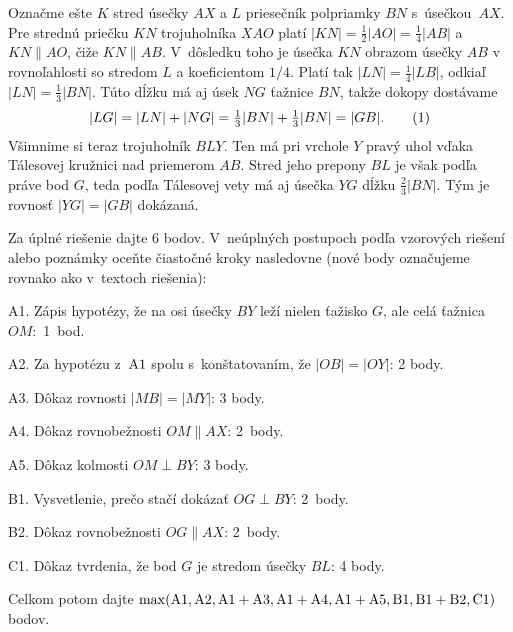 {Označme ešte $K$ stred úsečky $AX$ a $L$ priesečník polpriamky $BN$
s~úsečkou~$AX$. Pre strednú priečku $KN$ trojuholníka $XAO$ platí
$|KN|=\frac12|AO|=\frac14|AB|$ a $KN\parallel AO$, čiže $KN\parallel
AB$. V~dôsledku toho je úsečka $KN$ obrazom úsečky $AB$
v rovnoľahlosti so stredom $L$ a koeficientom $1/4$.
Platí tak $|LN|=\frac14|LB|$,
odkiaľ $|LN|=\frac13|BN|$. Túto dĺžku má aj úsek $NG$ ťažnice $BN$,
takže dokopy dostávame
$$
|LG|=|LN|+|NG|=\tfrac13|BN|+\tfrac13|BN|=|GB|.
\tag1
$$
Všimnime si teraz trojuholník $BLY$. Ten má pri vrchole $Y$ pravý uhol
vďaka Tálesovej kružnici nad priemerom $AB$. Stred jeho prepony
$BL$ je však podľa  práve bod $G$, teda podľa Tálesovej vety
má aj úsečka $YG$ dĺžku $\frac23|BN|$.
Tým je rovnosť $|YG|=|GB|$ dokázaná.
%

\schemaABC
Za úplné riešenie dajte 6 bodov. V~neúplných postupoch podľa
vzorových riešení alebo poznámky oceňte
čiastočné kroky nasledovne (nové body označujeme rovnako ako
v~textoch riešenia):
\item{A1.} Zápis hypotézy, že na osi úsečky $BY$ leží nielen ťažisko $G$, ale celá ťažnica $OM$:~1~bod.
\item{A2.} Za hypotézu z~$\rm A1$ spolu s~konštatovaním, že $|OB|=|OY|$: 2 body.
\item{A3.} Dôkaz rovnosti $|MB|=|MY|$: 3 body.
\item{A4.} Dôkaz rovnobežnosti $OM\parallel AX$: 2~body.
\item{A5.} Dôkaz kolmosti $OM\perp BY$: 3 body.
\item{B1.} Vysvetlenie, prečo stačí dokázať $OG\perp BY$: 2~body.
\item{B2.} Dôkaz rovnobežnosti $OG\parallel AX$: 2~body.
\item{C1.} Dôkaz tvrdenia, že bod $G$ je stredom úsečky $BL$: 4 body.

\noindent Celkom potom dajte
$\rm\max(A1, A2, A1 + A3, A1 + A4, A1 + A5, B1, B1 + B2, C1) $
bodov.
\endschema
}

